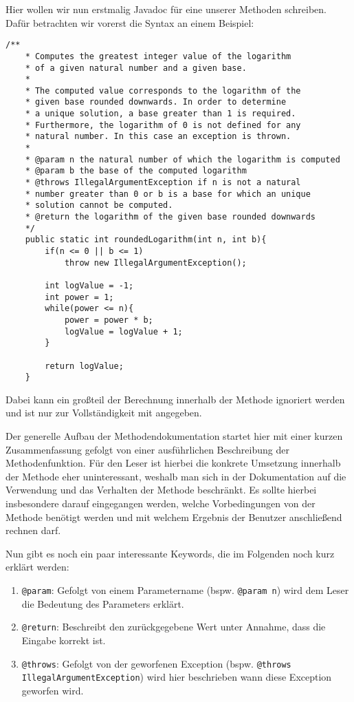 \begin{Infobox}[Javadoc]
    Hier wollen wir nun erstmalig Javadoc für eine unserer Methoden schreiben. Dafür betrachten wir vorerst die Syntax an einem Beispiel:
    \begin{lstlisting}[numbers=none]
    /**
    * Computes the greatest integer value of the logarithm 
    * of a given natural number and a given base. 
    * 
    * The computed value corresponds to the logarithm of the
    * given base rounded downwards. In order to determine
    * a unique solution, a base greater than 1 is required.
    * Furthermore, the logarithm of 0 is not defined for any 
    * natural number. In this case an exception is thrown.
    * 
    * @param n the natural number of which the logarithm is computed
    * @param b the base of the computed logarithm
    * @throws IllegalArgumentException if n is not a natural
    * number greater than 0 or b is a base for which an unique
    * solution cannot be computed.
    * @return the logarithm of the given base rounded downwards
    */
    public static int roundedLogarithm(int n, int b){
        if(n <= 0 || b <= 1)
            throw new IllegalArgumentException();
        
        int logValue = -1;
        int power = 1;
        while(power <= n){
            power = power * b;
            logValue = logValue + 1;
        }

        return logValue;
    }
    \end{lstlisting}
    Dabei kann ein großteil der Berechnung innerhalb der Methode ignoriert werden und ist nur zur Vollständigkeit mit angegeben. \par
    Der generelle Aufbau der Methodendokumentation startet hier mit einer kurzen Zusammenfassung 
    gefolgt von einer ausführlichen Beschreibung der Methodenfunktion. Für den Leser ist hierbei die 
    konkrete Umsetzung innerhalb der Methode eher uninteressant, weshalb man sich in der Dokumentation
    auf die Verwendung und das Verhalten der Methode beschränkt. Es sollte hierbei insbesondere darauf 
    eingegangen werden, welche Vorbedingungen von der Methode benötigt werden und mit welchem Ergebnis 
    der Benutzer anschließend rechnen darf. \par 
    Nun gibt es noch ein paar interessante Keywords, die im Folgenden noch kurz erklärt werden:
    \begin{enumerate}[label=\roman*)]
        \item \lstinline{@param}: Gefolgt von einem Parametername (bspw. \lstinline{@param n}) wird dem
        Leser die Bedeutung des Parameters erklärt.
        \item \lstinline{@return}: Beschreibt den zurückgegebene Wert unter Annahme, dass die Eingabe korrekt ist.
        \item \lstinline{@throws}: Gefolgt von der geworfenen Exception (bspw. \lstinline{@throws IllegalArgumentException})
        wird hier beschrieben wann diese Exception geworfen wird.
    \end{enumerate}
\end{Infobox}
